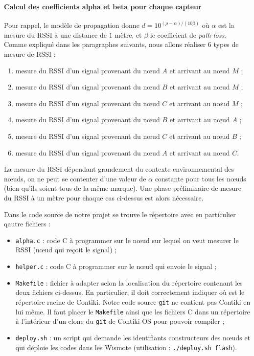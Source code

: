 \documentclass[french, a4paper, 12pt, parskip]{scrartcl}
\begin{document}
\paragraph{Calcul des coefficients alpha et beta pour chaque capteur}

Pour rappel, le modèle de propagation donne $d = 10^{(\rho-\alpha)/(10\beta)}$
où $\alpha$ est la mesure du RSSI à une distance de $1$ mètre, et $\beta$ le
coefficient de \textit{path-loss}. Comme expliqué dans les paragraphes
suivants, nous allons réaliser 6 types de mesure de RSSI :
\begin{enumerate}
  \item mesure du RSSI d'un signal provenant du nœud $A$ et arrivant au nœud $M$ ;
  \item mesure du RSSI d'un signal provenant du nœud $B$ et arrivant au nœud $M$ ;
  \item mesure du RSSI d'un signal provenant du nœud $C$ et arrivant au nœud $M$ ;
  \item mesure du RSSI d'un signal provenant du nœud $B$ et arrivant au nœud $A$ ;
  \item mesure du RSSI d'un signal provenant du nœud $C$ et arrivant au nœud $B$ ;
  \item mesure du RSSI d'un signal provenant du nœud $A$ et arrivant au nœud $C$.
\end{enumerate}

La mesure du RSSI dépendant grandement du contexte environnemental des nœuds, on
ne peut se contenter d'une valeur de $\alpha$ constante pour tous les nœuds
(bien qu'ils soient tous de la même marque). Une phase préliminaire de mesure du
RSSI à un mètre pour chaque cas ci-dessus est alors nécessaire.

Dans le code source de notre projet se trouve le répertoire
 avec en particulier qautre fichiers :
\begin{itemize}
  \item \verb+alpha.c+ : code C à programmer sur le nœud sur lequel on veut
    mesurer le RSSI (nœud qui reçoit le signal) ;
  \item \verb+helper.c+ : code C à programmer sur le nœud qui envoie le signal ;
  \item \verb+Makefile+ : fichier à adapter selon la localisation du répertoire
    contenant les deux fichiers ci-dessus. En particulier, il doit correctement
    indiquer où est le répertoire racine de Contiki. Notre code source
    \verb+git+ ne contient pas Contiki en lui même. Il faut placer le
    \verb+Makefile+ ainsi que les fichiers C dans un répertoire à l'intérieur d'un
    clone du \verb+git+ de Contiki OS pour pouvoir compiler ;
  \item \verb+deploy.sh+ : un script qui demande les identifiants constructeurs
    des nœuds et qui déploie les codes dans les Wismote (utilisation :
    \verb+./deploy.sh flash+).
\end{itemize}
\end{document}
